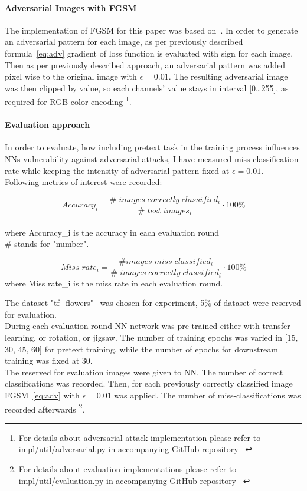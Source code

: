 \paragraph{Adversarial Images with FGSM}
The implementation of FGSM for this paper was based on~\cite{FGSM}.
In order to generate an adversarial pattern for each image, as per previously described formula~\ref{eq:adv}
gradient of loss function is evaluated with sign for each image.
Then as per previously described approach,
an adversarial pattern was added pixel wise to the original image with $\epsilon = 0.01$.
The resulting adversarial image was then clipped by value, so each channels' value stays in interval [0\ldots255],
as required for RGB color encoding
\footnote{For details about adversarial attack implementation please refer to
impl/util/adversarial.py in accompanying GitHub repository~\cite{github} \label{fn-adv}}.


\newpage
\paragraph{Evaluation approach}
In order to evaluate, how including pretext task in the training process influences NNs vulnerability against adversarial attacks,
I have measured miss-classification rate while keeping the intensity of adversarial pattern fixed at $\epsilon = 0.01$.
\\
Following metrics of interest were recorded:

\begin{equation}
    Accuracy_i = \frac{\# \; images \; correctly \; classified_i}{\# \; test \; images_i} \cdot 100 \%
\end{equation} \\
where Accuracy\_i is the accuracy in each evaluation round \\
\# stands for "number".

\begin{equation}
    Miss \; rate_i = \frac{\# images \; miss \; classified_i}{\# \; images \; correctly \; classified_i} \cdot 100 \%
\end{equation}
where Miss rate\_i is the miss rate in each evaluation round.


The dataset "tf\_flowers"~\cite{tfflowers} was chosen for experiment, 5\% of dataset were reserved for evaluation.
\\
During each evaluation round NN network was pre-trained either with transfer learning, or rotation, or jigsaw.
The number of training epochs was varied in [15, 30, 45, 60] for pretext training, while the number of epochs for downstream
training was fixed at 30.
\\
The reserved for evaluation images were given to NN. The number of correct classifications was recorded.
Then, for each previously correctly classified image FGSM~\ref{eq:adv} with $\epsilon = 0.01$ was applied.
The number of miss-classifications was recorded afterwards \footnote{For details about evaluation implementations please refer to
impl/util/evaluation.py in accompanying GitHub repository~\cite{github} \label{fn-eval}}.

